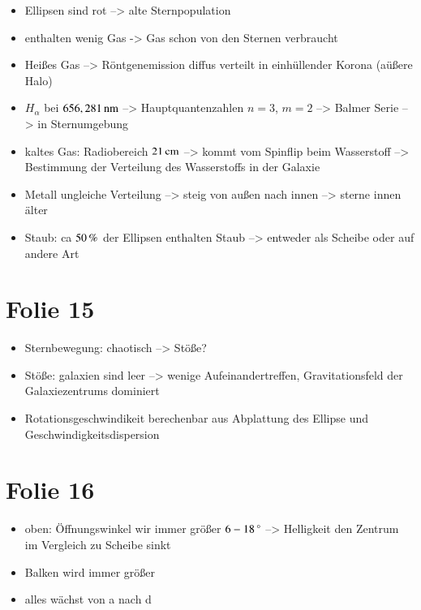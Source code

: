 \begin{itemize}
\item Ellipsen sind rot --> alte Sternpopulation
\item enthalten wenig Gas -> Gas schon von den Sternen verbraucht
\item Heißes Gas --> Röntgenemission diffus verteilt in einhüllender Korona (aüßere Halo)
\item $H_\alpha$ bei $\unit[656,281]{nm}$ -->  Hauptquantenzahlen $n=3$, $m=2$ --> Balmer Serie --> in Sternumgebung
\item kaltes Gas: Radiobereich $\unit[21]{cm}$ --> kommt vom Spinflip beim Wasserstoff --> Bestimmung der Verteilung des Wasserstoffs in der Galaxie
\item Metall ungleiche Verteilung --> steig von außen nach innen --> sterne innen älter
\item Staub: ca $\unit[50]{\%}$ der Ellipsen enthalten Staub --> entweder als Scheibe oder auf andere Art
\end{itemize}


\section{Folie 15}

\begin{itemize}
\item Sternbewegung: chaotisch --> Stöße?
\item Stöße: galaxien sind leer --> wenige Aufeinandertreffen, Gravitationsfeld der Galaxiezentrums dominiert
\item Rotationsgeschwindikeit berechenbar aus Abplattung des Ellipse und Geschwindigkeitsdispersion
\end{itemize}



\section{Folie 16}

\begin{itemize}
\item oben: Öffnungswinkel wir immer größer $\unit[6-18]{^\circ}$ --> Helligkeit den Zentrum im Vergleich zu Scheibe sinkt
\item Balken wird immer größer 
\item alles wächst von a nach d
\end{itemize}



